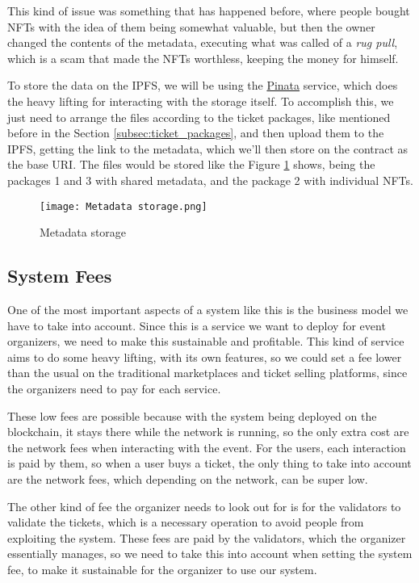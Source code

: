 This kind of issue was something that has happened before, where people bought
NFTs with the idea of them being somewhat valuable, but then the owner changed
the contents of the metadata, executing what was called of a \textit{rug pull},
which is a scam that made the NFTs worthless, keeping the money for himself.

To store the data on the IPFS, we will be using the
\href{https://www.pinata.cloud/}{Pinata} service, which does the heavy lifting
for interacting with the storage itself. To accomplish this, we just need to
arrange the files according to the ticket packages, like mentioned before in
the Section \ref{subsec:ticket_packages}, and then upload them to the IPFS,
getting the link to the metadata, which we'll then store on the contract as the
base URI. The files would be stored like the Figure \ref{fig:metadata_storage}
shows, being the packages 1 and 3 with shared metadata, and the package 2 with
individual NFTs.

\begin{figure}[H]
	\texttt{[image: Metadata storage.png]}
	\centering
	\caption{Metadata storage}
	\label{fig:metadata_storage}
\end{figure}

\subsection{System Fees}
\label{subsec:system_fees}

One of the most important aspects of a system like this is the business model
we have to take into account. Since this is a service we want to deploy for
event organizers, we need to make this sustainable and profitable. This kind of
service aims to do some heavy lifting, with its own features, so we could set a
fee lower than the usual on the traditional marketplaces and ticket selling
platforms, since the organizers need to pay for each service.

These low fees are possible because with the system being deployed on the
blockchain, it stays there while the network is running, so the only extra cost
are the network fees when interacting with the event. For the users, each
interaction is paid by them, so when a user buys a ticket, the only thing to
take into account are the network fees, which depending on the network, can be
super low.

The other kind of fee the organizer needs to look out for is for the validators
to validate the tickets, which is a necessary operation to avoid people from
exploiting the system. These fees are paid by the validators, which the
organizer essentially manages, so we need to take this into account when
setting the system fee, to make it sustainable for the organizer to use our
system.

